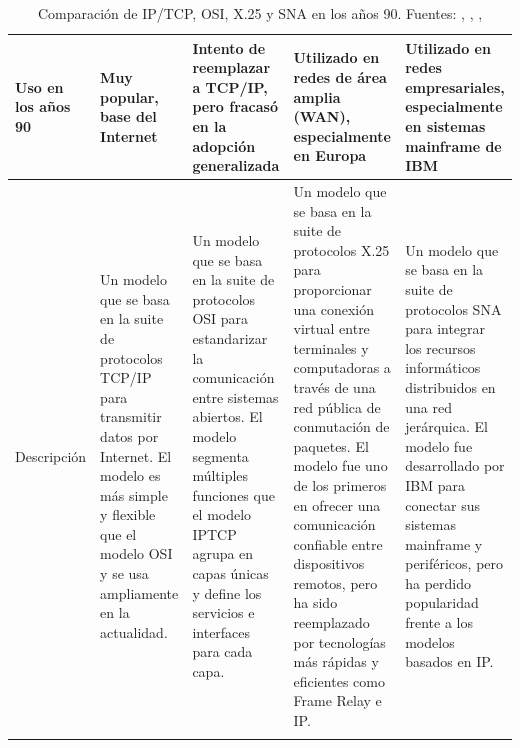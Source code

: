 \begin{longtable}{|>{\raggedright\arraybackslash}m{2.4cm}|>{\raggedright\arraybackslash}m{2.8cm}|>{\raggedright\arraybackslash}m{2.8cm}|>{\raggedright\arraybackslash}m{2.8cm}|>{\raggedright\arraybackslash}m{2.8cm}|}
      Uso en los años 90      & Muy popular, base del Internet                                                                                                                                                         & Intento de reemplazar a TCP/IP, pero fracasó en la adopción generalizada                                                                                                                                                                             & Utilizado en redes de área amplia (WAN), especialmente en Europa                                                                                                                                                                                                                                                                                                                 & Utilizado en redes empresariales, especialmente en sistemas mainframe de IBM                                                                                                                                                                                                           \\ \hline
      Descripción             & Un modelo que se basa en la suite de protocolos TCP/IP para transmitir datos por Internet. El modelo es más simple y flexible que el modelo OSI y se usa ampliamente en la actualidad. & Un modelo que se basa en la suite de protocolos OSI para estandarizar la comunicación entre sistemas abiertos. El modelo segmenta múltiples funciones que el modelo IPTCP agrupa en capas únicas y define los servicios e interfaces para cada capa. & Un modelo que se basa en la suite de protocolos X.25 para proporcionar una conexión virtual entre terminales y computadoras a través de una red pública de conmutación de paquetes. El modelo fue uno de los primeros en ofrecer una comunicación confiable entre dispositivos remotos, pero ha sido reemplazado por tecnologías más rápidas y eficientes como Frame Relay e IP. & Un modelo que se basa en la suite de protocolos SNA para integrar los recursos informáticos distribuidos en una red jerárquica. El modelo fue desarrollado por IBM para conectar sus sistemas mainframe y periféricos, pero ha perdido popularidad frente a los modelos basados en IP. \\ \hline
      \caption[Comparación de IP/TCP, OSI, X.25 y SNA en los años 90]{Comparación de IP/TCP, OSI, X.25 y SNA en los años 90. Fuentes: \cite{dasTCPIPProtocol2022}, \cite{ProtocoloControlTransmision2023}, \cite{ProtocolWars2023}, \cite{TCPIPModela} \cite{cooneySNAOSIVs2007a} \cite{LayersOSIModel2017a}}
      \label{tab:comparacion-protocolos-90}
\end{longtable}
\endgroup



